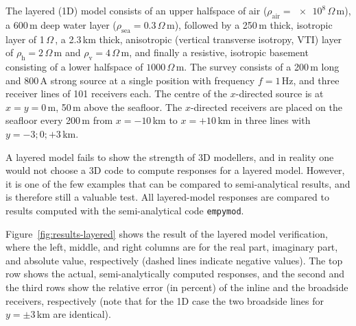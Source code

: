 \documentclass[
    paper,
  ]{geophysics}
\newcommand{\empymod}{\texttt{empymod}\xspace}
\newcommand{\ohmm}{\ensuremath{\Omega\,}\text{m}\xspace}
\begin{document}
The layered (1D) model consists of an upper halfspace of air ($\rho_\text{air}=\num{e8}\,\ohmm$), a 600\,m deep water layer ($\rho_\text{sea}=\num{0.3}\,\ohmm$), followed by a 250\,m thick, isotropic layer of 1\,\ohmm, a 2.3\,km thick, anisotropic (vertical transverse isotropy, VTI) layer of $\rho_\text{h}=2\,\ohmm$ and $\rho_\text{v}=4\,\ohmm$, and finally a resistive, isotropic basement consisting of a lower halfspace of $1000\,\ohmm$. The survey consists of a 200\,m long and 800\,A strong source at a single position with frequency $f=1\,$Hz, and three receiver lines of 101 receivers each. The centre of the $x$-directed source is at $x=y=0\,$m, 50\,m above the seafloor. The $x$-directed receivers are placed on the seafloor every 200\,m from $x=-10\,$km to $x=+10\,$km in three lines with $y=-3; 0; +3\,$km.


A layered model fails to show the strength of 3D modellers, and in reality one would not choose a 3D code to compute responses for a layered model. However, it is one of the few examples that can be compared to semi-analytical results, and is therefore still a valuable test. All layered-model responses are compared to results computed with the semi-analytical code \empymod\citep{GEO.17.Werthmuller}.

Figure~\ref{fig:results-layered} shows the result of the layered model verification, where the left, middle, and right columns are for the real part, imaginary part, and absolute value, respectively (dashed lines indicate negative values). The top row shows the actual, semi-analytically computed responses, and the second and the third rows show the relative error (in percent) of the inline and the broadside receivers, respectively (note that for the 1D case the two broadside lines for $y=\pm3\,$km are identical).

%
%
\end{document}
